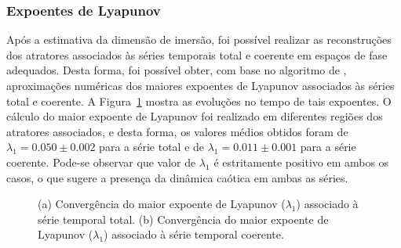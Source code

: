 \subsubsection{Expoentes de Lyapunov}

Após a estimativa da dimensão de imersão, foi possível realizar as reconstruções dos atratores associados às séries temporais total e coerente em espaços de fase adequados. Desta forma, foi possível obter, com base no algoritmo de , aproximações numéricas dos maiores expoentes de Lyapunov associados às séries total e coerente. A Figura~\ref{figtS0681200lyap} mostra as evoluções no tempo de tais expoentes. O cálculo do maior expoente de Lyapunov foi realizado em diferentes regiões dos atratores associados, e desta forma, os valores médios obtidos foram de $\lambda_{1}=0.050\pm0.002$ para a série total e de $\lambda_{1}=0.011\pm0.001$ para a série coerente. Pode-se observar que valor de $\lambda_{1}$ é estritamente positivo em ambos os casos, o que sugere a presença da dinâmica caótica em ambas as séries. 
 
\begin{figure}[ht]
\centering {}
\caption{(a) Convergência do maior expoente de Lyapunov ($\lambda_1$) associado à série temporal total. (b) Convergência do maior expoente de Lyapunov ($\lambda_1$) associado à série temporal coerente.}
\label{figtS0681200lyap}
\end{figure}

